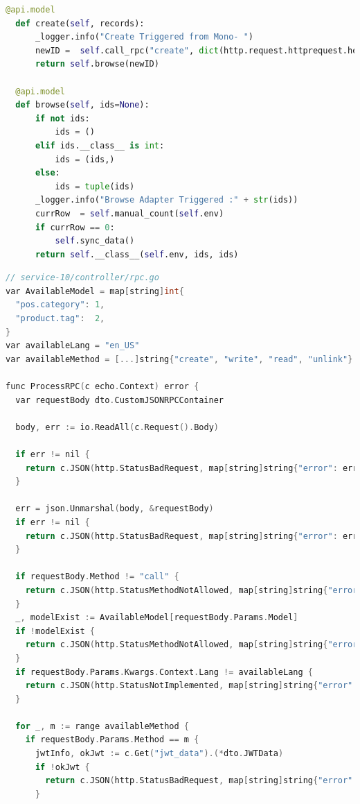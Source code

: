\begin{lstlisting}[style=mystyle, language=Python, caption={Penerapan Class Adapter}]
  @api.model
  def create(self, records):
      _logger.info("Create Triggered from Mono- ")
      newID =  self.call_rpc("create", dict(http.request.httprequest.headers), self.env.context ,[records])
      return self.browse(newID)
  
  @api.model
  def browse(self, ids=None):
      if not ids:
          ids = ()
      elif ids.__class__ is int:
          ids = (ids,)
      else:
          ids = tuple(ids)
      _logger.info("Browse Adapter Triggered :" + str(ids))
      currRow  = self.manual_count(self.env)
      if currRow == 0:
          self.sync_data()  
      return self.__class__(self.env, ids, ids)
\end{lstlisting} 

\pagebreak 

\begin{lstlisting}[style=mystyle, language=C, caption={Penerapan di Sisi Service-10 di kasus menambahkan PosCategory}]
// service-10/controller/rpc.go
var AvailableModel = map[string]int{
  "pos.category": 1,
  "product.tag":  2,
}
var availableLang = "en_US"
var availableMethod = [...]string{"create", "write", "read", "unlink"}

func ProcessRPC(c echo.Context) error {
  var requestBody dto.CustomJSONRPCContainer

  body, err := io.ReadAll(c.Request().Body)

  if err != nil {
    return c.JSON(http.StatusBadRequest, map[string]string{"error": err.Error()})
  }

  err = json.Unmarshal(body, &requestBody)
  if err != nil {
    return c.JSON(http.StatusBadRequest, map[string]string{"error": err.Error()})
  }

  if requestBody.Method != "call" {
    return c.JSON(http.StatusMethodNotAllowed, map[string]string{"error": "No method available for " + requestBody.Method})
  }
  _, modelExist := AvailableModel[requestBody.Params.Model]
  if !modelExist {
    return c.JSON(http.StatusMethodNotAllowed, map[string]string{"error": "No model available for " + requestBody.Params.Model})
  }
  if requestBody.Params.Kwargs.Context.Lang != availableLang {
    return c.JSON(http.StatusNotImplemented, map[string]string{"error": "Current context language is not yet available for this " + requestBody.Params.Model})
  }

  for _, m := range availableMethod {
    if requestBody.Params.Method == m {
      jwtInfo, okJwt := c.Get("jwt_data").(*dto.JWTData)
      if !okJwt {
        return c.JSON(http.StatusBadRequest, map[string]string{"error": "No JWT Content "})
      }


\end{lstlisting}
